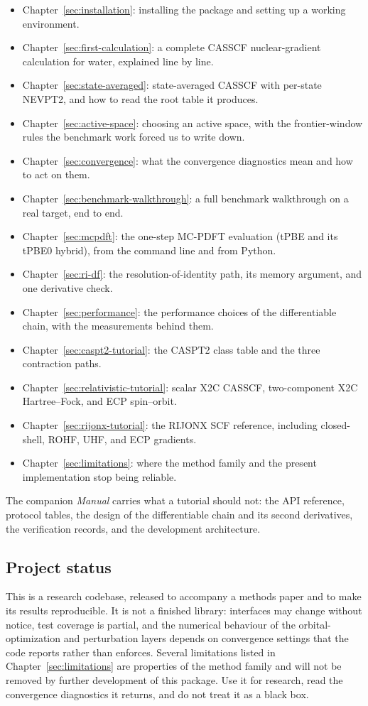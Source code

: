 \begin{itemize}
  \item Chapter~\ref{sec:installation}: installing the package and
    setting up a working environment.
  \item Chapter~\ref{sec:first-calculation}: a complete CASSCF
    nuclear-gradient calculation for water, explained line by line.
  \item Chapter~\ref{sec:state-averaged}: state-averaged CASSCF with
    per-state NEVPT2, and how to read the root table it produces.
  \item Chapter~\ref{sec:active-space}: choosing an active space, with
    the frontier-window rules the benchmark work forced us to write
    down.
  \item Chapter~\ref{sec:convergence}: what the convergence
    diagnostics mean and how to act on them.
  \item Chapter~\ref{sec:benchmark-walkthrough}: a full benchmark
    walkthrough on a real target, end to end.
  \item Chapter~\ref{sec:mcpdft}: the one-step MC-PDFT evaluation (tPBE and its tPBE0 hybrid), from the command line and from Python.
  \item Chapter~\ref{sec:ri-df}: the resolution-of-identity path, its
    memory argument, and one derivative check.
  \item Chapter~\ref{sec:performance}: the performance choices of the
    differentiable chain, with the measurements behind them.
  \item Chapter~\ref{sec:caspt2-tutorial}: the CASPT2 class table and
    the three contraction paths.
  \item Chapter~\ref{sec:relativistic-tutorial}: scalar X2C CASSCF,
    two-component X2C Hartree--Fock, and ECP spin--orbit.
  \item Chapter~\ref{sec:rijonx-tutorial}: the RIJONX SCF reference,
    including closed-shell, ROHF, UHF, and ECP gradients.
  \item Chapter~\ref{sec:limitations}: where the method family and the
    present implementation stop being reliable.
\end{itemize}

The companion \emph{Manual} carries what a tutorial should not: the
API reference, protocol tables, the design of the differentiable chain
and its second derivatives, the verification records, and the
development architecture.

\subsection{Project status}

This is a research codebase, released to accompany a methods paper and
to make its results reproducible.  It is not a finished library:
interfaces may change without notice, test coverage is partial, and
the numerical behaviour of the orbital-optimization and perturbation
layers depends on convergence settings that the code reports rather
than enforces.  Several limitations listed in
Chapter~\ref{sec:limitations} are properties of the method family and
will not be removed by further development of this package.  Use it
for research, read the convergence diagnostics it returns, and do not
treat it as a black box.
